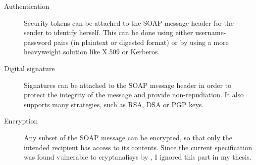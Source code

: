 \begin{description}
 \item[Authentication] Security tokens can be attached to the SOAP message header for the sender to identify herself. This can be done using either username-password pairs (in plaintext or digested format) or by using a more heavyweight solution like X.509 or Kerberos.
 \item[Digital signature] Signatures can be attached to the SOAP message header in order to protect the integrity of the message and provide non-repudiation. It also supports many strategies, such as RSA, DSA or PGP keys.
 \item[Encryption] Any subset of the SOAP message can be encrypted, so that only the intended recipient has access to its contents. Since the current specification was found vulnerable to cryptanalisys by \cite{acm-xmlenc-breaking}, I ignored this part in my thesis.
\end{description}
